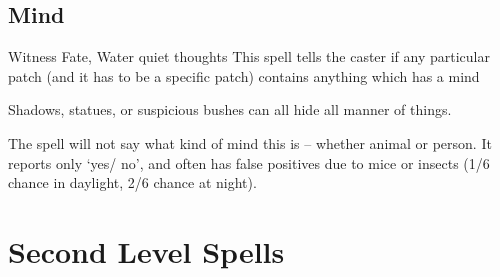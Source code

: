 \begin{multicols}{2}
\subsection{Mind}


  {}%
  {Witness}%
  {Fate, Water}%
  {quiet thoughts}%
  {This spell tells the caster if any particular patch (and it has to be a specific patch) contains anything which has a mind}%
  {Shadows, statues, or suspicious bushes can all hide all manner of things.

    The spell will not say what kind of mind this is -- whether animal or person.
    It reports only `yes/ no', and often has false positives due to mice or insects (1/6 chance in daylight, 2/6 chance at night).}

\end{multicols}

\section{Second Level Spells}

